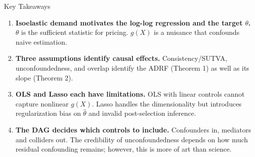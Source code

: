 \documentclass[aspectratio=169, 11pt]{beamer}
\begin{document}
\begin{frame}{Key Takeaways}

\begin{enumerate}
    \item \textbf{Isoelastic demand motivates the log-log regression and the target $\theta$.} $\theta$ is the sufficient statistic for pricing. $g(X)$ is a nuisance that confounds naive estimation.

    \pause\bigskip

    \item \textbf{Three assumptions identify causal effects.} Consistency/SUTVA, unconfoundedness, and overlap identify the ADRF (Theorem 1) as well as its slope (Theorem 2).

    \pause\bigskip

    \item \textbf{OLS and Lasso each have limitations.} OLS with linear controls cannot capture nonlinear $g(X)$. Lasso handles the dimensionality but introduces regularization bias on $\hat{\theta}$ and invalid post-selection inference.
    
    \pause\bigskip

    \item \textbf{The DAG decides which controls to include.} Confounders in, mediators and colliders out. The credibility of unconfoundedness depends on how much residual confounding remains; however, this is more of art than science. 

\end{enumerate}

\end{frame}
\end{document}
